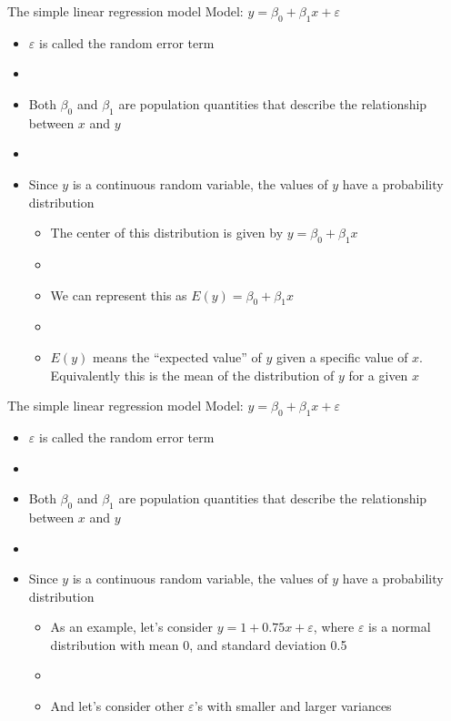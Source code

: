 \documentclass[xcolor=dvipsnames]{beamer}
\begin{document}
\begin{frame}{The simple linear regression model}
Model: $y = \beta_0 + \beta_1 x + \varepsilon$
\begin{itemize}
	\item $\varepsilon$ is called the random error term
	\item[]
	\item Both $\beta_0$ and $\beta_1$ are population quantities that describe the relationship between $x$ and $y$
	\item[] 
	\item Since $y$ is a continuous random variable, the values of $y$ have a probability distribution
	\begin{itemize}
		\item The center of this distribution is given by $y = \beta_0 + \beta_1 x $
		\item[]
		\item We can represent this as $E(y) = \beta_0 + \beta_1 x$
		\item[] 
		\item $E(y)$ means the ``expected value'' of $y$ given a specific value of $x$. Equivalently this is the mean of the distribution of $y$ for a given $x$
	\end{itemize}
\end{itemize}
\end{frame}

\begin{frame}{The simple linear regression model}
Model: $y = \beta_0 + \beta_1 x + \varepsilon$
\begin{itemize}
	\item $\varepsilon$ is called the random error term
	\item[]
	\item Both $\beta_0$ and $\beta_1$ are population quantities that describe the relationship between $x$ and $y$
	\item[] 
	\item Since $y$ is a continuous random variable, the values of $y$ have a probability distribution
	\begin{itemize}
		\item As an example, let's consider $y = 1 + 0.75x + \varepsilon$, where $\varepsilon$ is a normal distribution with mean 0, and standard deviation 0.5
		\item[]
		\item And let's consider other $\varepsilon$'s with smaller and larger variances
	\end{itemize}
\end{itemize}
\end{frame}
\end{document}

